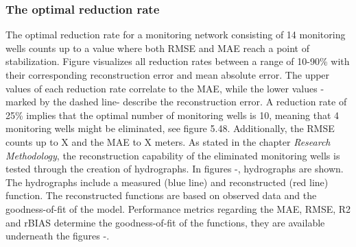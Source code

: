 \subsubsection{The optimal reduction rate}
The optimal reduction rate for a monitoring network consisting of 14 monitoring wells counts up to a value where both RMSE and MAE reach a point of stabilization. Figure  visualizes all reduction rates between a range of 10-90\% with their corresponding reconstruction error and mean absolute error. The upper values of each reduction rate correlate to the MAE, while the lower values - marked by the dashed line- describe the reconstruction error.  A reduction rate of 25\% implies that the optimal number of monitoring wells is 10, meaning that 4 monitoring wells might be eliminated, see figure 5.48. Additionally, the RMSE counts up to X and the MAE to X meters. As stated in the chapter \textit{Research Methodology}, the reconstruction capability of the eliminated monitoring wells is tested through the creation of hydrographs. In figures -, hydrographs are shown. The hydrographs include a measured (blue line) and reconstructed (red line) function. The reconstructed functions are based on observed data and the goodness-of-fit of the model. Performance metrics regarding the MAE, RMSE, R2 and rBIAS determine the goodness-of-fit of the functions, they are available underneath the figures -. 

